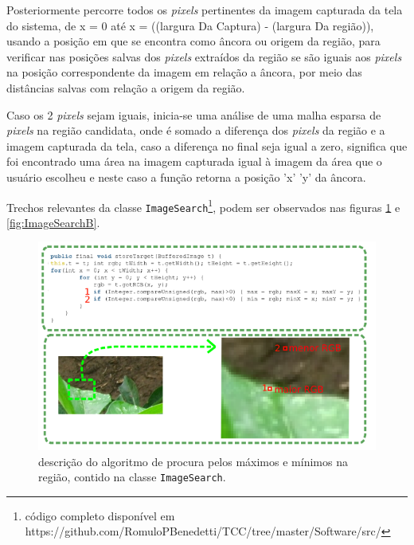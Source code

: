 \documentclass[tg]{mdtufsm}
\begin{document}
                    Posteriormente percorre todos os \emph{pixels} pertinentes da imagem capturada da tela do sistema, de x = 0 até x = ((largura Da Captura) - (largura Da região)), usando a posição em que se encontra como âncora ou origem da região, para verificar nas posições salvas dos \emph{pixels} extraídos da região se são iguais aos \emph{pixels} na posição correspondente da imagem em relação a âncora, por meio das distâncias salvas com relação a origem da região.

                    Caso os 2 \emph{pixels} sejam iguais, inicia-se uma análise de uma malha esparsa de \emph{pixels} na região candidata, onde é somado a diferença dos \emph{pixels} da região e a imagem capturada da tela, caso a diferença no final seja igual a zero, significa que foi encontrado uma área na imagem capturada igual à imagem da área que o usuário escolheu e neste caso a função retorna a posição 'x' 'y' da âncora.

                    Trechos relevantes da classe \texttt{ImageSearch}\footnote{código completo disponível em https://github.com/RomuloPBenedetti/TCC/tree/master/Software/src/}, podem ser observados nas figuras \ref{fig:ImageSearchA} e \ref{fig:ImageSearchB}.

                    \begin{figure}[!htb]
                        {\centering
                        \includegraphics[width=1.0\textwidth]{imagens/codeImageA.png}
                        \caption{descrição do algoritmo de procura pelos máximos e mínimos na região, contido na classe \texttt{ImageSearch}.}
                        \label{fig:ImageSearchA}}
                    \end{figure}
\end{document}
